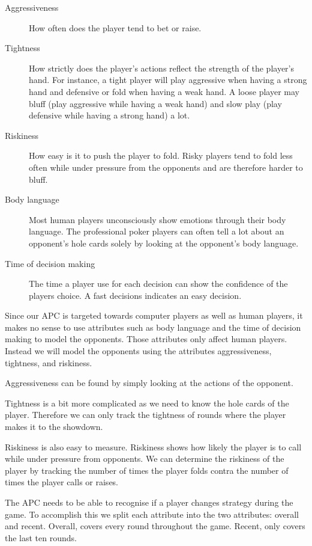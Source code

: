\begin{description}
\item[Aggressiveness] How often does the player tend to bet or raise.
\item[Tightness] How strictly does the player's actions reflect the strength of the player's hand. For instance, a tight player will play aggressive when having a strong hand and defensive or fold when having a weak hand. A loose player may bluff (play aggressive while having a weak hand) and slow play (play defensive while having a strong hand) a lot.
\item[Riskiness] How easy is it to push the player to fold. Risky players tend to fold less often while under pressure from the opponents and are therefore harder to bluff.
\item[Body language] Most human players unconsciously show emotions through their body language. The professional poker players can often tell a lot about an opponent's hole cards solely by looking at the opponent's body language.
\item[Time of decision making] The time a player use for each decision can show the confidence of the players choice. A fast decisions indicates an easy decision. 
\end{description}

Since our APC is targeted towards computer players as well as human players, it makes no sense to use attributes such as body language and the time of decision making to model the opponents. Those attributes only affect human players. Instead we will model the opponents using the attributes aggressiveness, tightness, and riskiness.

Aggressiveness can be found by simply looking at the actions of the opponent. 

Tightness is a bit more complicated as we need to know the hole cards of the player. Therefore we can only track the tightness of rounds where the player makes it to the showdown.

Riskiness is also easy to measure. Riskiness shows how likely the player is to call while under pressure from opponents. We can determine the riskiness of the player by tracking the number of times the player folds contra the number of times the player calls or raises.

The APC needs to be able to recognise if a player changes strategy during the game. To accomplish this we split each attribute into the two attributes: overall and recent. Overall, covers every round throughout the game. Recent, only covers the last ten rounds.

